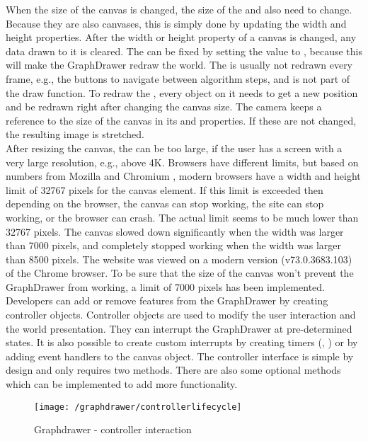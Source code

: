 When the size of the canvas is changed, the size of the  and  also need to change. Because they are also canvases, this is simply done by updating the width and height properties. After the width or height property of a canvas is changed, any data drawn to it is cleared. The  can be fixed by setting the  value to , because this will make the GraphDrawer redraw the world. The  is usually not redrawn every frame, e.g., the buttons to navigate between algorithm steps, and is not part of the draw function. To redraw the , every object on it needs to get a new position and be redrawn right after changing the canvas size. The camera keeps a reference to the size of the canvas in its  and  properties. If these are not changed, the resulting image is stretched. 
\\[11pt]
After resizing the canvas, the  can be too large, if the user has a screen with a very large resolution, e.g., above 4K. Browsers have different limits, but based on numbers from Mozilla \cite{CanvasMaxSize} and Chromium \cite{CanvasMaxSizeChromeium}, modern browsers have a width and height limit of 32767 pixels for the canvas element. If this limit is exceeded then depending on the browser, the canvas can stop working, the site can stop working, or the browser can crash. The actual limit seems to be much lower than 32767 pixels. The canvas slowed down significantly when the width was larger than 7000 pixels, and completely stopped working when the width was larger than 8500 pixels. The website was viewed on a modern version (v73.0.3683.103) of the Chrome browser. To be sure that the size of the canvas won't prevent the GraphDrawer from working, a limit of 7000 pixels has been implemented.
\\[11pt]
Developers can add or remove features from the GraphDrawer by creating controller objects. Controller objects are used to modify the user interaction and the world presentation. They can interrupt the GraphDrawer at pre-determined states. It is also possible to create custom interrupts by creating timers (, ) or by adding event handlers to the canvas object. The controller interface is simple by design and only requires two methods. There are also some optional methods which can be implemented to add more functionality.
\begin{figure}[H]
    \centering
    \texttt{[image: /graphdrawer/controllerlifecycle]}
    \caption{Graphdrawer - controller interaction}
    \label{fig:graphdrawerControllerLifeCycle}
\end{figure}

